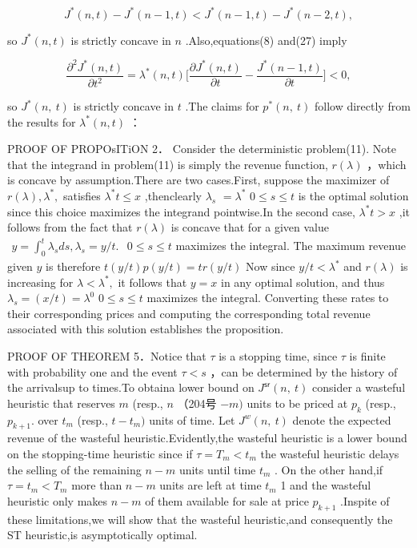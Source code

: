 \[
J ^ { * } ( n , t ) - J ^ { * } ( n - 1 , t ) < J ^ { * } ( n - 1 , t ) - J ^ { * } ( n - 2 , t ) ,
\]

so \(J ^ { * } ( n , t )\) is strictly concave in \(n\)
.Also,equations(8) and(27) imply

\[
\frac { \partial ^ { 2 } J ^ { * } ( n , t ) } { \partial t ^ { 2 } } = \lambda ^ { * } ( n , t ) \bigg [ \frac { \partial J ^ { * } ( n , t ) } { \partial t } - \frac { J ^ { * } ( n - 1 , t ) } { \partial t } \bigg ] < 0 ,
\]

so \(J ^ { * } ( n , \ t )\) is strictly concave in \(t\) .The claims
for \(p ^ { * } ( n , \ t )\) follow directly from the results for
\(\lambda ^ { * } ( n , t )\) ：

PROOF OF PROPOsITiON 2． Consider the deterministic problem(11). Note
that the integrand in problem(11) is simply the revenue function,
\(r ( \lambda )\) ，which is concave by assumption.There are two
cases.First, suppose the maximizer of
\(r ( \lambda ) , \lambda ^ { * } ,\) satisfies
\(\lambda ^ { * } t \leq x\) ,thenclearly \(\lambda _ { s }\)
\(= \lambda ^ { * }\) \(0 \leq s \leq t\) is the optimal solution since
this choice maximizes the integrand pointwise.In the second case,
\(\lambda ^ { * } t > x\) ,it follows from the fact that
\(r ( \lambda )\) is concave that for a given value
\(\begin{array} { r } { y = \int _ { 0 } ^ { t } \lambda _ { s } d s , \lambda _ { s } = y / t . } \end{array}\)
\(0 \leq s \leq t\) maximizes the integral. The maximum revenue given
\(y\) is therefore \(t ( y / t ) p ( y / t ) = t r ( y / t )\) Now since
\(y / t < \lambda ^ { * }\) and \(r ( \lambda )\) is increasing for
\(\lambda < \lambda ^ { * } ,\) it follows that \(y = x\) in any optimal
solution, and thus \(\lambda _ { s } = ( x / t ) = \lambda ^ { 0 }\)
\(0 \leq s \leq t\) maximizes the integral. Converting these rates to
their corresponding prices and computing the corresponding total revenue
associated with this solution establishes the proposition.

PROOF OF THEOREM 5．Notice that \(\tau\) is a stopping time, since
\(\tau\) is finite with probability one and the event \(\tau < s\) ，can
be determined by the history of the arrivalsup to times.To obtaina lower
bound on \(J ^ { \mathsf { s r } } ( n , \ t )\) consider a wasteful
heuristic that reserves \(m\) (resp., \(n\) （204号 \(- m )\) units to
be priced at \(p _ { k }\) (resp., \(p _ { k + 1 } .\) over
\(t _ { m }\) (resp., \(t - t _ { m } )\) units of time. Let
\(J ^ { w } ( n , \ t )\) denote the expected revenue of the wasteful
heuristic.Evidently,the wasteful heuristic is a lower bound on the
stopping-time heuristic since if \(\tau = T _ { m } < t _ { m }\) the
wasteful heuristic delays the selling of the remaining \(n - m\) units
until time \(t _ { m }\) . On the other hand,if
\(\tau = t _ { m } < T _ { m }\) more than \(n - m\) units are left at
time \(t _ { m }\) 1 and the wasteful heuristic only makes \(n - m\) of
them available for sale at price \(p _ { k + 1 }\) .Inspite of these
limitations,we will show that the wasteful heuristic,and consequently
the ST heuristic,is asymptotically optimal.


